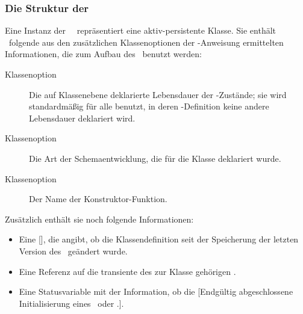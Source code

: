\subsubsection{Die Struktur der \protect\spc[n]\ \protect\clsmc\ %
\protect{}}
%
Eine Instanz der \clsmc\ \ repr\"{a}sentiert
eine ak\-tiv-per\-si\-sten\-te Klasse. Sie enth\"{a}lt \ua\ folgende aus
den zu\-s\"{a}tz\-li\-chen Klassenoptionen der -Anweisung
ermittelten Informationen, die zum Aufbau des \clsdo[es]\ benutzt
werden:
%
\begin{description}
%
\item[Klassenoption ]
Die auf Klassenebene deklarierte Lebensdauer der
\Slt\/-Zust\"{a}nde; sie wird standardm\"{a}\ss{}ig f\"{u}r alle \Slt[s]\/ benutzt,
in deren \Slt\/-Definition keine andere Lebensdauer deklariert wird.
%
\item[Klassenoption ]
Die Art der Schemaentwicklung, die f\"{u}r die Klasse deklariert wurde.
%
\item[Klassenoption ]
Der Name der Konstruktor-Funktion.
%
\end{description}
%
Zus\"{a}tzlich enth\"{a}lt sie noch folgende Informationen:
%
\begin{itemize}
%
\item Eine [], die angibt, ob die
Klassendefinition seit der Speicherung der letzten Version des
\clsdo[es]\ ge\-\"{a}n\-dert wurde.
%
\item Eine Referenz auf die transiente \representation{} des zur Klasse
geh\"{o}rigen \clsdo[es].
%
\item Eine Statusvariable mit der Information, ob die
[{Endg\"{u}ltig abgeschlossene
Initialisierung eines \protect\clsmo[es]\ oder \protect\clsdo[es].}].
%
\end{itemize}
%
